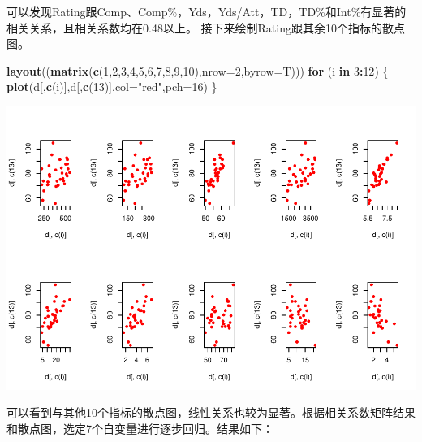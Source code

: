 \documentclass[]{article}
\newenvironment{Shaded}{\begin{snugshade}}{\end{snugshade}}
\newcommand{\KeywordTok}[1]{\textcolor[rgb]{0.13,0.29,0.53}{\textbf{#1}}}
\newcommand{\DataTypeTok}[1]{\textcolor[rgb]{0.13,0.29,0.53}{#1}}
\newcommand{\DecValTok}[1]{\textcolor[rgb]{0.00,0.00,0.81}{#1}}
\newcommand{\StringTok}[1]{\textcolor[rgb]{0.31,0.60,0.02}{#1}}
\newcommand{\ControlFlowTok}[1]{\textcolor[rgb]{0.13,0.29,0.53}{\textbf{#1}}}
\newcommand{\OperatorTok}[1]{\textcolor[rgb]{0.81,0.36,0.00}{\textbf{#1}}}
\newcommand{\NormalTok}[1]{#1}
\begin{document}
可以发现Rating跟Comp、Comp\%，Yds，Yds/Att，TD，TD\%和Int\%有显著的相关关系，且相关系数均在0.48以上。
接下来绘制Rating跟其余10个指标的散点图。

\begin{Shaded}
\begin{Highlighting}[]
\KeywordTok{layout}\NormalTok{((}\KeywordTok{matrix}\NormalTok{(}\KeywordTok{c}\NormalTok{(}\DecValTok{1}\NormalTok{,}\DecValTok{2}\NormalTok{,}\DecValTok{3}\NormalTok{,}\DecValTok{4}\NormalTok{,}\DecValTok{5}\NormalTok{,}\DecValTok{6}\NormalTok{,}\DecValTok{7}\NormalTok{,}\DecValTok{8}\NormalTok{,}\DecValTok{9}\NormalTok{,}\DecValTok{10}\NormalTok{),}\DataTypeTok{nrow=}\DecValTok{2}\NormalTok{,}\DataTypeTok{byrow=}\NormalTok{T)))}
\ControlFlowTok{for}\NormalTok{ (i }\ControlFlowTok{in} \DecValTok{3}\OperatorTok{:}\DecValTok{12}\NormalTok{) \{}
  \KeywordTok{plot}\NormalTok{(d[,}\KeywordTok{c}\NormalTok{(i)],d[,}\KeywordTok{c}\NormalTok{(}\DecValTok{13}\NormalTok{)],}\DataTypeTok{col=}\StringTok{"red"}\NormalTok{,}\DataTypeTok{pch=}\DecValTok{16}\NormalTok{)}
\NormalTok{\}}
\end{Highlighting}
\end{Shaded}

\includegraphics{Chapter14_files/figure-latex/unnamed-chunk-25-1.pdf}

可以看到与其他10个指标的散点图，线性关系也较为显著。根据相关系数矩阵结果和散点图，选定7个自变量进行逐步回归。结果如下：

\begin{Shaded}
\end{Shaded}
\end{document}
